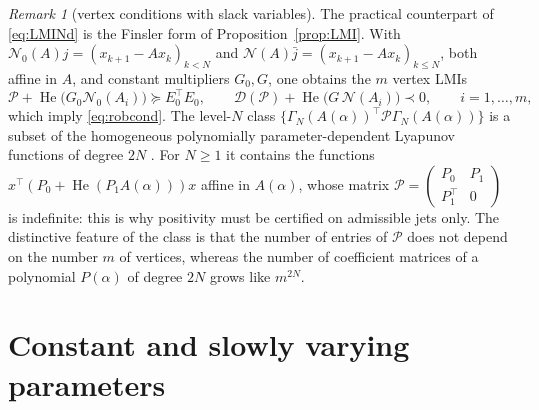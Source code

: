 \documentclass[preprint,12pt,authoryear]{elsarticle}
\theoremstyle{definition}
\theoremstyle{remark}
\newtheorem{remark}[theorem]{Remark}
\newcommand{\tr}{^{\top}}
\newcommand{\PP}{\mathcal{P}}
\newcommand{\DD}{\mathcal{D}}
\newcommand{\NN}{\mathcal{N}}
\DeclareMathOperator{\He}{He}
\begin{document}
\begin{remark}[vertex conditions with slack variables]\label{rem:slack}
The practical counterpart of \eqref{eq:LMINd} is the Finsler form of Proposition~\ref{prop:LMI}. With $\NN_0(A)j=(x_{k+1}-Ax_k)_{k<N}$ and $\NN(A)\bar j=(x_{k+1}-Ax_k)_{k\le N}$, both affine in $A$, and constant multipliers $G_0,G$, one obtains the $m$ vertex LMIs
\begin{equation}\label{eq:vertex}
\PP+\He\big(G_0\NN_0(A_i)\big)\succeq E_0\tr E_0,\qquad\DD(\PP)+\He\big(G\,\NN(A_i)\big)\prec0,\qquad i=1,\dots,m,
\end{equation}
which imply \eqref{eq:robcond}. The level-$N$ class $\{\Gamma_N(A(\alpha))\tr\PP\Gamma_N(A(\alpha))\}$ is a subset of the homogeneous polynomially parameter-dependent Lyapunov functions of degree $2N$ \citep{Chesi2005,OliveiraPeres2007}. For $N\ge1$ it contains the functions $x\tr(P_0+\He(P_1A(\alpha)))x$ affine in $A(\alpha)$, whose matrix $\PP=\begin{pmatrix}P_0&P_1\\P_1\tr&0\end{pmatrix}$ is indefinite: this is why positivity must be certified on admissible jets only. The distinctive feature of the class is that the number of entries of $\PP$ does not depend on the number $m$ of vertices, whereas the number of coefficient matrices of a polynomial $P(\alpha)$ of degree $2N$ grows like $m^{2N}$.
\end{remark}

\section{Constant and slowly varying parameters}\label{sec:tv}
\end{document}
